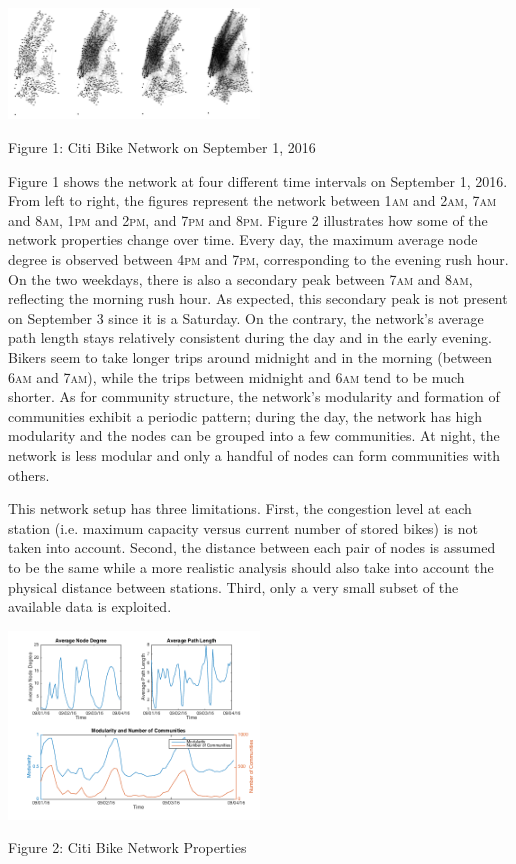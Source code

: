 \documentclass[times, 10pt,twocolumn]{article}
\begin{document}
\centerline{\includegraphics[width=0.5\textwidth]{m2/combined.jpg}}
\centerline{Figure 1: Citi Bike Network on September 1, 2016}
\hfill \break
\indent Figure 1 shows the network at four different time intervals on September 1, 2016. From left to right, the figures represent the network between 1\textsc{am} and 2\textsc{am}, 7\textsc{am} and 8\textsc{am}, 1\textsc{pm} and 2\textsc{pm}, and 7\textsc{pm} and 8\textsc{pm}. Figure 2 illustrates how some of the network properties change over time. Every day, the maximum average node degree is observed between 4\textsc{pm} and 7\textsc{pm}, corresponding to the evening rush hour. On the two weekdays, there is also a secondary peak between 7\textsc{am} and 8\textsc{am}, reflecting the morning rush hour. As expected, this secondary peak is not present on September 3 since it is a Saturday. On the contrary, the network's average path length stays relatively consistent during the day and in the early evening. Bikers seem to take longer trips around midnight and in the morning (between 6\textsc{am} and 7\textsc{am}), while the trips between midnight and 6\textsc{am} tend to be much shorter. As for community structure, the network's modularity and formation of communities exhibit a periodic pattern; during the day, the network has high modularity and the nodes can be grouped into a few communities. At night, the network is less modular and only a handful of nodes can form communities with others.

This network setup has three limitations. First, the congestion level at each station (i.e. maximum capacity versus current number of stored bikes) is not taken into account. Second, the distance between each pair of nodes is assumed to be the same while a more realistic analysis should also take into account the physical distance between stations. Third, only a very small subset of the available data is exploited.

\centerline{\includegraphics[width=0.5\textwidth]{m2/plotterfigure.png}}
\centerline{Figure 2: Citi Bike Network Properties}
\end{document}
